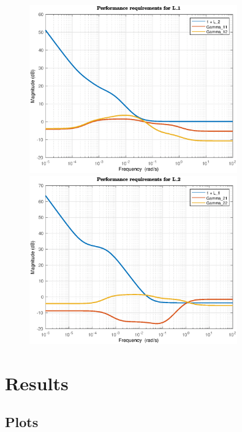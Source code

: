\documentclass[12pt]{article}
\begin{document}
\begin{figure}[p]
\centering
\includegraphics[width=0.8\textwidth]{../Systemanalyse/Log_Data_to_Matlab/Figurer/LV_identifisering/L1_krav_PI-reg.eps}
\caption{}
\label{fig:L1_performance2}

\includegraphics[width=0.8\textwidth]{../Systemanalyse/Log_Data_to_Matlab/Figurer/LV_identifisering/L2_krav_PI-reg.eps}
\caption{}
\label{fig:L2_performance2}
\end{figure}

\newpage
\section{Results}
\subsection{Plots}
\end{document}
